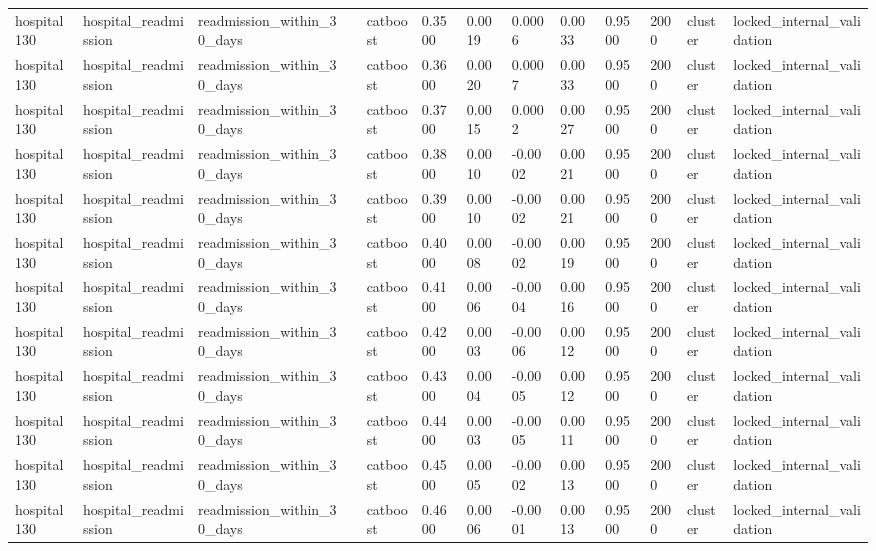 \begin{tabular}{lllllllllllll}
hospital130 & hospital\_readmission & readmission\_within\_30\_days &  & catboost & 0.3500 & 0.0019 & 0.0006 & 0.0033 & 0.9500 & 2000 & cluster & locked\_internal\_validation \\
hospital130 & hospital\_readmission & readmission\_within\_30\_days &  & catboost & 0.3600 & 0.0020 & 0.0007 & 0.0033 & 0.9500 & 2000 & cluster & locked\_internal\_validation \\
hospital130 & hospital\_readmission & readmission\_within\_30\_days &  & catboost & 0.3700 & 0.0015 & 0.0002 & 0.0027 & 0.9500 & 2000 & cluster & locked\_internal\_validation \\
hospital130 & hospital\_readmission & readmission\_within\_30\_days &  & catboost & 0.3800 & 0.0010 & -0.0002 & 0.0021 & 0.9500 & 2000 & cluster & locked\_internal\_validation \\
hospital130 & hospital\_readmission & readmission\_within\_30\_days &  & catboost & 0.3900 & 0.0010 & -0.0002 & 0.0021 & 0.9500 & 2000 & cluster & locked\_internal\_validation \\
hospital130 & hospital\_readmission & readmission\_within\_30\_days &  & catboost & 0.4000 & 0.0008 & -0.0002 & 0.0019 & 0.9500 & 2000 & cluster & locked\_internal\_validation \\
hospital130 & hospital\_readmission & readmission\_within\_30\_days &  & catboost & 0.4100 & 0.0006 & -0.0004 & 0.0016 & 0.9500 & 2000 & cluster & locked\_internal\_validation \\
hospital130 & hospital\_readmission & readmission\_within\_30\_days &  & catboost & 0.4200 & 0.0003 & -0.0006 & 0.0012 & 0.9500 & 2000 & cluster & locked\_internal\_validation \\
hospital130 & hospital\_readmission & readmission\_within\_30\_days &  & catboost & 0.4300 & 0.0004 & -0.0005 & 0.0012 & 0.9500 & 2000 & cluster & locked\_internal\_validation \\
hospital130 & hospital\_readmission & readmission\_within\_30\_days &  & catboost & 0.4400 & 0.0003 & -0.0005 & 0.0011 & 0.9500 & 2000 & cluster & locked\_internal\_validation \\
hospital130 & hospital\_readmission & readmission\_within\_30\_days &  & catboost & 0.4500 & 0.0005 & -0.0002 & 0.0013 & 0.9500 & 2000 & cluster & locked\_internal\_validation \\
hospital130 & hospital\_readmission & readmission\_within\_30\_days &  & catboost & 0.4600 & 0.0006 & -0.0001 & 0.0013 & 0.9500 & 2000 & cluster & locked\_internal\_validation \\

\end{tabular}
